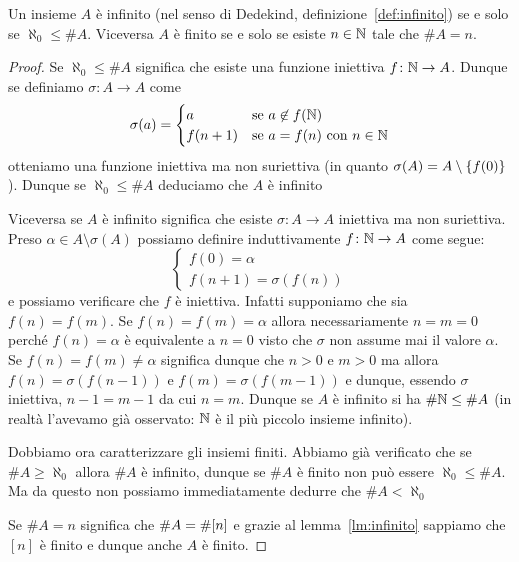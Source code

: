 \begin{theorem}
Un insieme $A$ è infinito (nel senso di Dedekind, definizione~\ref{def:infinito})
se e solo se $\aleph_0 \le \# A$.
Viceversa $A$ è finito se e solo se esiste $n\in{\mathbb N}$ tale che $\# A = n$.
\end{theorem}
%
\begin{proof}
Se $\aleph_0 \le \#A$ significa che esiste una funzione 
iniettiva $f\colon {\mathbb N}\to A$. 
Dunque se definiamo $\sigma \colon A \to A$ come
\[
\sigma(a) = \begin{cases}
  a & \text{se $a\not\in f({\mathbb N})$}\\
  f(n+1) & \text{se $a=f(n)$ con $n\in{\mathbb N}$}
\end{cases}
\]
otteniamo una funzione iniettiva ma non suriettiva 
(in quanto $\sigma(A) = A\setminus{\left\{ f(0) \right\}}$).
Dunque se $\aleph_0\le \#A$ deduciamo che $A$ è infinito

Viceversa se $A$ è infinito significa che esiste $\sigma\colon A \to A$ 
iniettiva ma non suriettiva. 
Preso $\alpha \in A \setminus\sigma(A)$
possiamo definire induttivamente $f\colon {\mathbb N}\to A$ come segue:
\[
\begin{cases}
  f(0) = \alpha\\
  f(n+1) = \sigma(f(n))
\end{cases}
\]
e possiamo verificare che $f$ è iniettiva. 
Infatti supponiamo che sia $f(n)=f(m)$.
Se $f(n)=f(m)=\alpha$ allora necessariamente $n=m=0$ 
perché $f(n)=\alpha$ è equivalente a $n=0$ visto che $\sigma$
non assume mai il valore $\alpha$.
Se $f(n)=f(m)\neq \alpha$ significa dunque che $n>0$ e $m>0$
ma allora $f(n)=\sigma(f(n-1))$ e $f(m)=\sigma(f(m-1))$
e dunque, essendo $\sigma$ iniettiva, $n-1=m-1$ da cui $n=m$. 
Dunque se $A$ è infinito si ha $\#{\mathbb N}\le \#A$
(in realtà l'avevamo già osservato: ${\mathbb N}$ è il più piccolo insieme infinito).

Dobbiamo ora caratterizzare gli insiemi finiti.
Abbiamo già verificato che se $\#A \ge \aleph_0$ 
allora $\#A$ è infinito, dunque se $\#A$ è finito 
non può essere $\aleph_0 \le \#A$.
Ma da questo non possiamo immediatamente 
dedurre che%
%
$\#A < \aleph_0$%

Se $\#A = n$ significa che $\#A = \#{\left[ n \right]}$ e 
grazie al lemma~\ref{lm:infinito} sappiamo che $[n]$ è finito 
e dunque anche $A$ è finito.


\end{proof}
